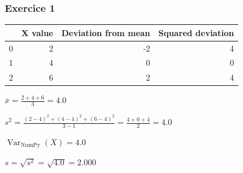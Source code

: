 \documentclass[11pt]{article}
\begin{document}
    \subsubsection{Exercice 1}\label{exercice-1}

    
    \begin{tabular}{lrrr}
\toprule
 & X value & Deviation from mean & Squared deviation \\
\midrule
0 & 2 & -2 & 4 \\
1 & 4 & 0 & 0 \\
2 & 6 & 2 & 4 \\
\bottomrule
\end{tabular}


    
    $\displaystyle \bar{x} = \frac{2+4+6}{3} = 4.0$

    
    $\displaystyle \boxed{s^2 = \frac{(2-4)^2+(4-4)^2+(6-4)^2}{3-1} = \frac{4+0+4}{2} = 4.0}$

    
    $\displaystyle \operatorname{Var}_{\mathrm{NumPy}}(X) = 4.0$

    
    $\displaystyle s = \sqrt{s^2} = \sqrt{4.0} = 2.000$
\end{document}
